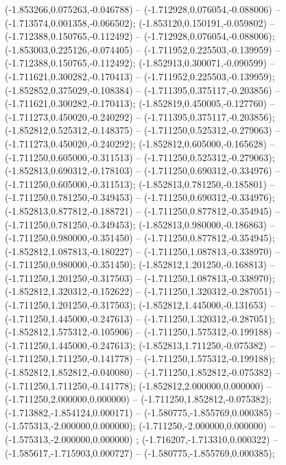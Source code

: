  (-1.853266,0.075263,-0.046788) -- (-1.712928,0.076054,-0.088006) -- (-1.713574,0.001358,-0.066502);
 (-1.853120,0.150191,-0.059802) -- (-1.712388,0.150765,-0.112492) -- (-1.712928,0.076054,-0.088006);
 (-1.853003,0.225126,-0.074405) -- (-1.711952,0.225503,-0.139959) -- (-1.712388,0.150765,-0.112492);
 (-1.852913,0.300071,-0.090599) -- (-1.711621,0.300282,-0.170413) -- (-1.711952,0.225503,-0.139959);
 (-1.852852,0.375029,-0.108384) -- (-1.711395,0.375117,-0.203856) -- (-1.711621,0.300282,-0.170413);
 (-1.852819,0.450005,-0.127760) -- (-1.711273,0.450020,-0.240292) -- (-1.711395,0.375117,-0.203856);
 (-1.852812,0.525312,-0.148375) -- (-1.711250,0.525312,-0.279063) -- (-1.711273,0.450020,-0.240292);
 (-1.852812,0.605000,-0.165628) -- (-1.711250,0.605000,-0.311513) -- (-1.711250,0.525312,-0.279063);
 (-1.852813,0.690312,-0.178103) -- (-1.711250,0.690312,-0.334976) -- (-1.711250,0.605000,-0.311513);
 (-1.852813,0.781250,-0.185801) -- (-1.711250,0.781250,-0.349453) -- (-1.711250,0.690312,-0.334976);
 (-1.852813,0.877812,-0.188721) -- (-1.711250,0.877812,-0.354945) -- (-1.711250,0.781250,-0.349453);
 (-1.852813,0.980000,-0.186863) -- (-1.711250,0.980000,-0.351450) -- (-1.711250,0.877812,-0.354945);
 (-1.852812,1.087813,-0.180227) -- (-1.711250,1.087813,-0.338970) -- (-1.711250,0.980000,-0.351450);
 (-1.852812,1.201250,-0.168813) -- (-1.711250,1.201250,-0.317503) -- (-1.711250,1.087813,-0.338970);
 (-1.852812,1.320312,-0.152622) -- (-1.711250,1.320312,-0.287051) -- (-1.711250,1.201250,-0.317503);
 (-1.852812,1.445000,-0.131653) -- (-1.711250,1.445000,-0.247613) -- (-1.711250,1.320312,-0.287051);
 (-1.852812,1.575312,-0.105906) -- (-1.711250,1.575312,-0.199188) -- (-1.711250,1.445000,-0.247613);
 (-1.852813,1.711250,-0.075382) -- (-1.711250,1.711250,-0.141778) -- (-1.711250,1.575312,-0.199188);
 (-1.852812,1.852812,-0.040080) -- (-1.711250,1.852812,-0.075382) -- (-1.711250,1.711250,-0.141778);
 (-1.852812,2.000000,0.000000) -- (-1.711250,2.000000,0.000000) -- (-1.711250,1.852812,-0.075382);
 (-1.713882,-1.854124,0.000171) -- (-1.580775,-1.855769,0.000385) -- (-1.575313,-2.000000,0.000000);
 (-1.711250,-2.000000,0.000000) -- (-1.575313,-2.000000,0.000000) ;
 (-1.716207,-1.713310,0.000322) -- (-1.585617,-1.715903,0.000727) -- (-1.580775,-1.855769,0.000385);
